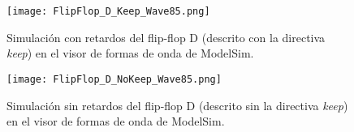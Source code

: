 \begin{figure}[ht]
	\centering
	\texttt{[image: FlipFlop\_D\_Keep\_Wave85.png]}
	\caption{Simulación con retardos del flip-flop D (descrito con la directiva \textit{keep}) en el visor de formas de onda de ModelSim. \label{fig:FlipFlop_D_Keep_Wave85}}
\end{figure}

\begin{figure}[ht]
	\centering
	\texttt{[image: FlipFlop\_D\_NoKeep\_Wave85.png]}
	\caption{Simulación sin retardos del flip-flop D (descrito sin la directiva \textit{keep}) en el visor de formas de onda de ModelSim. \label{fig:FlipFlop_D_NoKeep_Wave85}}
\end{figure}